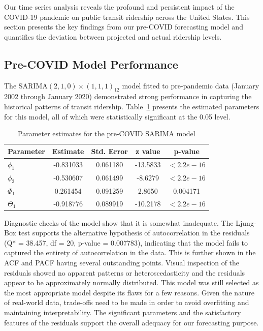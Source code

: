 \documentclass[11pt]{article}
\begin{document}
Our time series analysis reveals the profound and persistent impact of the COVID-19 pandemic on public transit ridership across the United States. This section presents the key findings from our pre-COVID forecasting model and quantifies the deviation between projected and actual ridership levels.

\subsection{Pre-COVID Model Performance}

The SARIMA$(2,1,0)\times(1,1,1)_{12}$ model fitted to pre-pandemic data (January 2002 through January 2020) demonstrated strong performance in capturing the historical patterns of transit ridership. Table~\ref{t:model_params} presents the estimated parameters for this model, all of which were statistically significant at the 0.05 level.

\begin{table}[!ht]
\caption{Parameter estimates for the pre-COVID SARIMA model}
\label{t:model_params}
\begin{center}
\begin{tabular}{lcccc}
\hline
Parameter & Estimate & Std. Error & z value & p-value \\
\hline
$\phi_1$   & -0.831033 &  0.061180 & -13.5833 & $< 2.2e-16$ \\
$\phi_2$   & -0.530607 &  0.061499 &  -8.6279 & $< 2.2e-16$ \\
$\Phi_1$   &  0.261454 &  0.091259 &   2.8650 &  0.004171   \\
$\Theta_1$ & -0.918776 &  0.089919 & -10.2178 & $< 2.2e-16$ \\
\hline
\end{tabular}
\end{center}
\end{table}

Diagnostic checks of the model show that it is somewhat inadequate. The Ljung-Box test supports the alternative hypothesis of autocorrelation in the residuals (Q* = 38.457, df = 20, p-value = 0.007783), indicating that the model fails to captured the entirety of autocorrelation in the data. This is further shown in the ACF and PACF having several outstanding points. Visual inspection of the residuals showed no apparent patterns or heteroscedasticity and the residuals appear to be approximately normally distributed. This model was still selected as the most appropriate model despite its flaws for a few reasons. Given the nature of real-world data, trade-offs need to be made in order to avoid overfitting and maintaining interpretability. The significant parameters and the satisfactory features of the residuals support the overall adequacy for our forecasting purpose.
\end{document}
